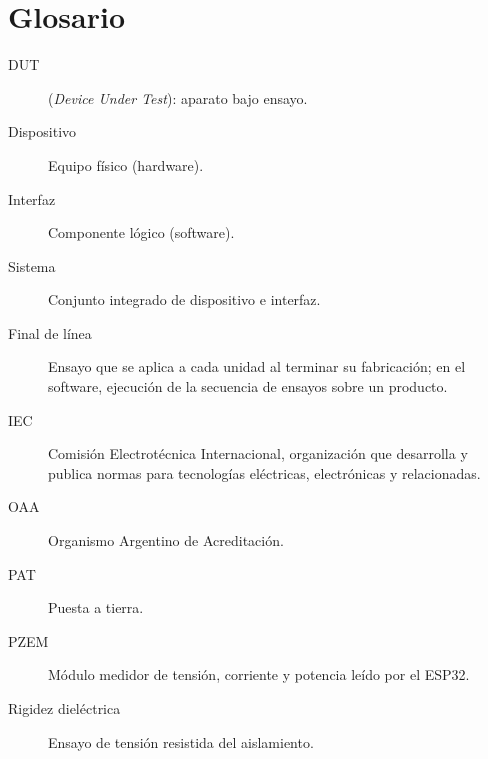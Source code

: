 \section*{Glosario}

\begin{description}
    \item[DUT] (\emph{Device Under Test}): aparato bajo ensayo.
    \item[Dispositivo] Equipo físico (hardware).
    \item[Interfaz] Componente lógico (software).
    \item[Sistema] Conjunto integrado de dispositivo e interfaz.
    \item[Final de línea] Ensayo que se aplica a cada unidad al terminar su
          fabricación; en el software, ejecución de la secuencia de ensayos sobre
          un producto.
    \item[IEC] Comisión Electrotécnica Internacional, organización que desarrolla
          y publica normas para tecnologías eléctricas, electrónicas y
          relacionadas.
    \item[OAA] Organismo Argentino de Acreditación.
    \item[PAT] Puesta a tierra.
    \item[PZEM] Módulo medidor de tensión, corriente y potencia leído por el
          ESP32.
    \item[Rigidez dieléctrica] Ensayo de tensión resistida del aislamiento.
\end{description}
